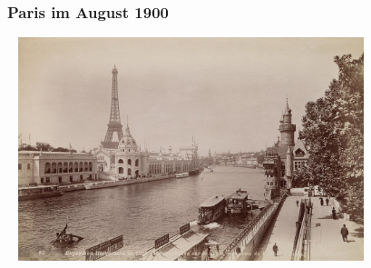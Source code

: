 \documentclass[aspectratio=1610,onlymath]{beamer}
\begin{document}
%



\begin{frame}\frametitle{Paris im August 1900}\label{frame_paris}

~\hfill
\includegraphics[height=6.5cm]{images/Paris-1900-Weltausstellung}
\hfill~

\end{frame}
\end{document}
